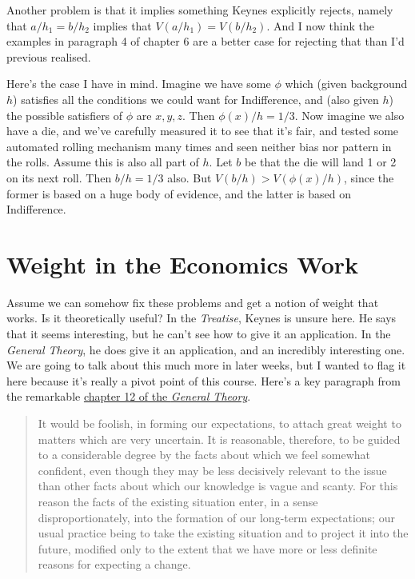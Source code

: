 \documentclass[
  11pt,
  letterpaper,
  DIV=11,
  numbers=noendperiod,
  oneside]{scrartcl}
\begin{document}
Another problem is that it implies something Keynes explicitly rejects,
namely that \(a/h_1 = b/h_2\) implies that \(V(a/h_1) = V(b/h_2)\). And
I now think the examples in paragraph 4 of chapter 6 are a better case
for rejecting that than I'd previous realised.

Here's the case I have in mind. Imagine we have some \(\phi\) which
(given background \(h\)) satisfies all the conditions we could want for
Indifference, and (also given \(h\)) the possible satisfiers of \(\phi\)
are \(x,y,z\). Then \(\phi(x)/h = 1/3\). Now imagine we also have a die,
and we've carefully measured it to see that it's fair, and tested some
automated rolling mechanism many times and seen neither bias nor pattern
in the rolls. Assume this is also all part of \(h\). Let \(b\) be that
the die will land 1 or 2 on its next roll. Then \(b/h = 1/3\) also. But
\(V(b/h) > V(\phi(x)/h)\), since the former is based on a huge body of
evidence, and the latter is based on Indifference.

\section{Weight in the Economics
Work}\label{weight-in-the-economics-work}

Assume we can somehow fix these problems and get a notion of weight that
works. Is it theoretically useful? In the \emph{Treatise}, Keynes is
unsure here. He says that it seems interesting, but he can't see how to
give it an application. In the \emph{General Theory}, he does give it an
application, and an incredibly interesting one. We are going to talk
about this much more in later weeks, but I wanted to flag it here
because it's really a pivot point of this course. Here's a key paragraph
from the remarkable
\href{http://brian.weatherson.org/general-theory/12.html}{chapter 12 of
the \emph{General Theory}}.

\begin{quote}
It would be foolish, in forming our expectations, to attach great weight
to matters which are very uncertain. It is reasonable, therefore, to be
guided to a considerable degree by the facts about which we feel
somewhat confident, even though they may be less decisively relevant to
the issue than other facts about which our knowledge is vague and
scanty. For this reason the facts of the existing situation enter, in a
sense disproportionately, into the formation of our long-term
expectations; our usual practice being to take the existing situation
and to project it into the future, modified only to the extent that we
have more or less definite reasons for expecting a change.
\end{quote}
\end{document}
